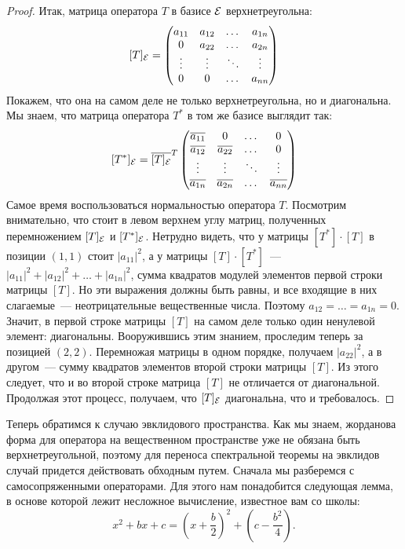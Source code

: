 \begin{proof}
Итак, матрица оператора $T$ в базисе $\mathcal E$ верхнетреугольна:
$$
[T]_{\mathcal E} = \begin{pmatrix}
a_{11} & a_{12} & \dots & a_{1n} \\
0 & a_{22} & \dots & a_{2n} \\
\vdots & \vdots & \ddots & \vdots \\
0 & 0 & \dots & a_{nn}
\end{pmatrix}
$$
Покажем, что она на самом деле
не только верхнетреугольна, но и диагональна.
Мы знаем, что матрица оператора $T^*$ в том же базисе выглядит так:
$$
[T^*]_{\mathcal E} = \overline{[T]_{\mathcal E}}^T\begin{pmatrix}
\overline{a_{11}} & 0 & \dots & 0 \\
\overline{a_{12}} & \overline{a_{22}} & \dots & 0 \\
\vdots & \vdots & \ddots & \vdots \\
\overline{a_{1n}} & \overline{a_{2n}} & \dots & \overline{a_{nn}}
\end{pmatrix}
$$
Самое время воспользоваться нормальностью оператора $T$.
Посмотрим внимательно, что стоит в левом верхнем углу матриц,
полученных перемножением $[T]_{\mathcal E}$ и $[T^*]_{\mathcal E}$.
Нетрудно видеть, что у матрицы $[T^*]\cdot [T]$ в позиции $(1,1)$
стоит $|a_{11}|^2$, а у матрицы $[T]\cdot [T^*]$~---
$|a_{11}|^2 + |a_{12}|^2 + \dots + |a_{1n}|^2$,
сумма квадратов модулей элементов первой строки матрицы $[T]$.
Но эти выражения должны быть равны, и все входящие в них слагаемые~---
неотрицательные вещественные числа. Поэтому
$a_{12} = \dots = a_{1n} = 0$. Значит, в первой строке матрицы $[T]$
на самом деле только один ненулевой элемент: диагональны.
Вооружившись этим знанием, проследим теперь за позицией $(2,2)$.
Перемножая матрицы в одном порядке, получаем $|a_{22}|^2$,
а в другом~--- сумму квадратов элементов второй строки матрицы $[T]$.
Из этого следует, что и во второй строке матрица $[T]$ не отличается
от диагональной. Продолжая этот процесс, получаем,
что $[T]_{\mathcal E}$ диагональна, что и требовалось.
\end{proof}

Теперь обратимся к случаю эвклидового пространства. Как мы знаем,
жорданова форма для оператора на вещественном пространстве уже не
обязана быть верхнетреугольной, поэтому для переноса спектральной
теоремы на эвклидов случай придется действовать обходным путем.
Сначала мы разберемся с самосопряженными операторами.
Для этого нам понадобится следующая лемма, в основе которой лежит
несложное вычисление, известное вам со школы:
$$
x^2 + bx + c = \left(x+\frac{b}{2}\right)^2 +
\left(c-\frac{b^2}{4}\right).
$$

